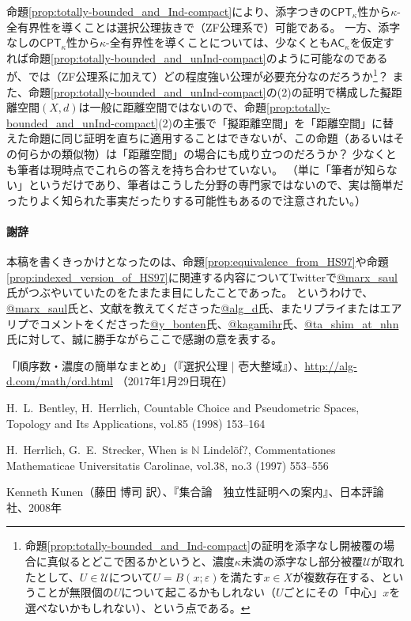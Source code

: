 \documentclass{jarticle}
\begin{document}
命題\ref{prop:totally-bounded_and_Ind-compact}により、添字つきの$\mathsf{CPT}_{\kappa}$性から$\kappa$-全有界性を導くことは選択公理抜きで（ZF公理系で）可能である。
一方、添字なしの$\mathsf{CPT}_{\kappa}$性から$\kappa$-全有界性を導くことについては、少なくとも$\mathsf{AC}_{\kappa}$を仮定すれば命題\ref{prop:totally-bounded_and_unInd-compact}のように可能なのであるが、では（ZF公理系に加えて）どの程度強い公理が必要充分なのだろうか\footnote{命題\ref{prop:totally-bounded_and_Ind-compact}の証明を添字なし開被覆の場合に真似るとどこで困るかというと、濃度$\kappa$未満の添字なし部分被覆$\mathcal{U}$が取れたとして、$U \in \mathcal{U}$について$U = B(x;\varepsilon)$を満たす$x \in X$が複数存在する、ということが無限個の$U$について起こるかもしれない（$U$ごとにその「中心」$x$を選べないかもしれない）、という点である。}？
また、命題\ref{prop:totally-bounded_and_unInd-compact}の(2)の証明で構成した擬距離空間$(X,d)$は一般に距離空間ではないので、命題\ref{prop:totally-bounded_and_unInd-compact}(2)の主張で「擬距離空間」を「距離空間」に替えた命題に同じ証明を直ちに適用することはできないが、この命題（あるいはその何らかの類似物）は「距離空間」の場合にも成り立つのだろうか？
少なくとも筆者は現時点でこれらの答えを持ち合わせていない。
（単に「筆者が知らない」というだけであり、筆者はこうした分野の専門家ではないので、実は簡単だったりよく知られた事実だったりする可能性もあるので注意されたい。）

\paragraph{謝辞}
本稿を書くきっかけとなったのは、命題\ref{prop:equivalence_from_HS97}や命題\ref{prop:indexed_version_of_HS97}に関連する内容についてTwitterで\url{@marx_saul}氏がつぶやいていたのをたまたま目にしたことであった。
というわけで、\url{@marx_saul}氏と、文献\cite{HS97}を教えてくださった\url{@alg_d}氏、またリプライまたはエアリプでコメントをくださった\url{@y_bonten}氏、\url{@kagamihr}氏、\url{@ta_shim_at_nhn}氏に対して、誠に勝手ながらここで感謝の意を表する。

\begin{thebibliography}{9}

「順序数・濃度の簡単なまとめ」（『選択公理 | 壱大整域』）、\url{http://alg-d.com/math/ord.html} （2017年1月29日現在）

H.~L.~Bentley, H.~Herrlich,
Countable Choice and Pseudometric Spaces,
Topology and Its Applications, vol.85 (1998) 153--164

H.~Herrlich, G.~E.~Strecker,
When is $\mathbb{N}$ Lindel\"{o}f?,
Commentationes Mathematicae Universitatis Carolinae, vol.38, no.3 (1997) 553--556

Kenneth Kunen（藤田 博司 訳）、『集合論　独立性証明への案内』、日本評論社、2008年


\end{thebibliography}
\end{document}
